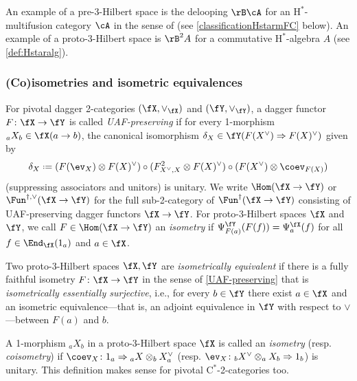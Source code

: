 \documentclass[12pt,reqno]{amsart}
\newcommand{\Cstar}{\ensuremath{\mathrm{C}^{*}}}
\newcommand{\Hstar}{\ensuremath{\mathrm{H}^{*}}}
\newcommand{\defn}[1]{\emph{#1}}
\DeclareRobustCommand{\coloneq}{\mathrel{\vcenter{\baselineskip0.5ex\lineskiplimit0pt\hbox{\scriptsize{\upshape.}}\hbox{\scriptsize{\upshape.}}}}=}
\begin{document}
\begin{example}\label{ex:delooping-pre-3-hilb}
An example of a pre-3-Hilbert space is the delooping $\rB\cA$ for an $\Hstar$-multifusion category $\cA$ in the sense of {{\cite[Defn. 3.1]{3Hilb}}} (see \cref{classificationHstarmFC} below). An example of a proto-3-Hilbert space is $\rB^2 A$ for a commutative $\Hstar$-algebra $A$ (see \cref{def:Hstaralg}).  
\end{example}

\subsubsection{(Co)isometries and isometric equivalences}

\begin{definition}
  \label{UAF-preserving}
  For pivotal dagger 2-categories $(\fX,\vee_\fX)$ and $(\fY,\vee_\fY)$, a dagger functor $F\colon\fX\to\fY$ is called \defn{UAF-preserving} if for every 1-morphism ${}_aX_b\in\fX(a\to b)$, the canonical isomorphism $\delta_X\in\fY(F(X^\vee)\Rightarrow F(X)^\vee)$ given by
  \[
    \delta_X\coloneq(F(\ev_X)\otimes F(X)^\vee)\circ (F_{X^\vee,X}^2\otimes F(X)^\vee)\circ(F(X^\vee)\otimes \coev_{F(X)})
  \]
  (suppressing associators and unitors) is unitary. We write $\Hom(\fX\to\fY)$ or $\Fun^{\dag,\vee}(\fX\to\fY)$ for the full sub-2-category of $\Fun^\dag(\fX\to\fY)$ consisting of UAF-preserving dagger functors $\fX\to\fY$. For proto-3-Hilbert spaces $\fX$ and $\fY$, we call $F\in\Hom(\fX\to\fY)$ an \defn{isometry} if $\Psi^\fY_{F(a)}(F(f))=\Psi^\fX_a(f)$ for all $f\in\End_\fX(1_a)$ and $a\in\fX$.
\end{definition}

\begin{definition}\label{def:isometric-equivalence}
  Two proto-3-Hilbert spaces $\fX,\fY$ are \defn{isometrically equivalent} if there is a fully faithful isometry $F\colon\fX\to\fY$ in the sense of \cref{UAF-preserving} that is \defn{isometrically essentially surjective}, i.e., for every $b\in\fY$ there exist $a\in\fX$ and an isometric equivalence---that is, an adjoint equivalence in $\fY$ with respect to $\vee$---between $F(a)$ and $b$.
\end{definition}

\begin{definition}
A 1-morphism ${}_aX_b$ in a proto-3-Hilbert space $\fX$ is called an \defn{isometry} (resp. \defn{coisometry}) if $\coev_X\colon 1_a\Rightarrow {}_aX\otimes_b X_a^\vee$ (resp. $\ev_X\colon {}_bX^\vee\otimes_a X_b\Rightarrow 1_b$) is unitary. This definition makes sense for pivotal $\Cstar$-2-categories too.
\end{definition}
\end{document}
